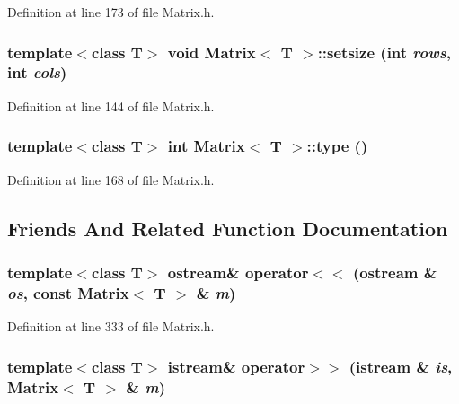 Definition at line 173 of file Matrix.h.

\hypertarget{classMatrix_a8be203acf909fbb2050bf37470c88802}{
\subsubsection[{setsize}]{\setlength{\rightskip}{0pt plus 5cm}template$<$class T$>$ void {\bf Matrix}$<$ T $>$::setsize (int {\em rows}, \/  int {\em cols})}}
\label{classMatrix_a8be203acf909fbb2050bf37470c88802}


Definition at line 144 of file Matrix.h.

\hypertarget{classMatrix_af4fd573f5a962ec6c893051785f42480}{
\subsubsection[{type}]{\setlength{\rightskip}{0pt plus 5cm}template$<$class T$>$ int {\bf Matrix}$<$ T $>$::type ()}}
\label{classMatrix_af4fd573f5a962ec6c893051785f42480}


Definition at line 168 of file Matrix.h.



\subsection{Friends And Related Function Documentation}
\hypertarget{classMatrix_a5ed9a90fd6f010e7e9840a17d92d5361}{
\subsubsection[{operator$<$$<$}]{\setlength{\rightskip}{0pt plus 5cm}template$<$class T$>$ ostream\& operator$<$$<$ (ostream \& {\em os}, \/  const {\bf Matrix}$<$ T $>$ \& {\em m})}}
\label{classMatrix_a5ed9a90fd6f010e7e9840a17d92d5361}


Definition at line 333 of file Matrix.h.

\hypertarget{classMatrix_afcea9fa7d9a5052070fe1fda963ef237}{
\subsubsection[{operator$>$$>$}]{\setlength{\rightskip}{0pt plus 5cm}template$<$class T$>$ istream\& operator$>$$>$ (istream \& {\em is}, \/  {\bf Matrix}$<$ T $>$ \& {\em m})}}
\label{classMatrix_afcea9fa7d9a5052070fe1fda963ef237}


